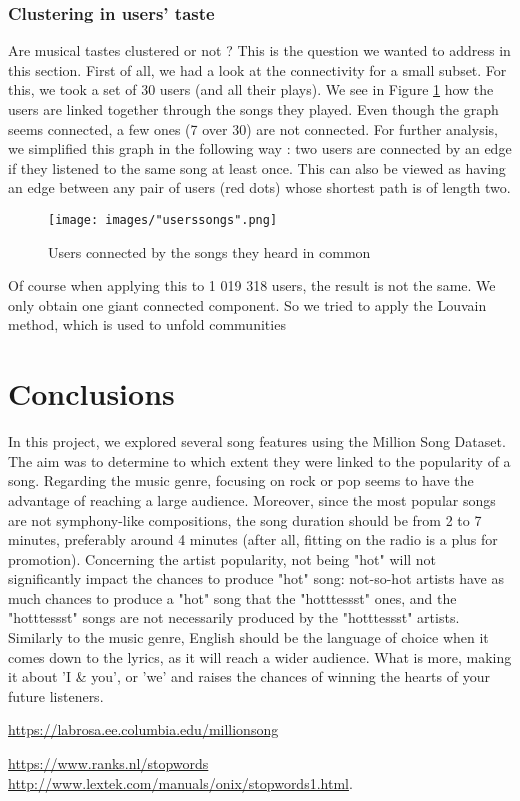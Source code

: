 \documentclass[10pt]{article}
\renewcommand\_{\textunderscore\allowbreak}
\begin{document}
\subsubsection{Clustering in users' taste}
Are musical tastes clustered or not ? This is the question we wanted to address in this section. First of all, we had a look at the connectivity for a small subset. For this, we took a set of 30 users (and all their plays). We see in Figure \ref{fig:user_connected_by_song} how the users are linked together through the songs they played. Even though the graph seems connected, a few ones (7 over 30) are not connected. For further analysis, we simplified this graph in the following way : two users are connected by an edge if they listened to the same song at least once. This can also be viewed as having an edge between any pair of users (red dots) whose shortest path is of length two. 

\begin{figure}[h!]
\centering
\captionsetup{width=0.8\textwidth}
\texttt{[image: images/"users\_songs\_1".png]}
\caption{Users connected by the songs they heard in common}
\label{fig:user_connected_by_song}
\end{figure}

Of course when applying this to 1 019 318 users, the result is not the same. We only obtain one giant connected component. So we tried to apply the Louvain method, which is used to unfold communities 

\section{Conclusions}
In this project, we explored several song features using the Million Song Dataset. The aim was to determine to which extent they were linked to the popularity of a song.
Regarding the music genre, focusing on rock or pop seems to have the advantage of reaching a large audience.
Moreover, since the most popular songs are not symphony-like compositions, the song duration should be from 2 to 7 minutes, preferably around 4 minutes (after all, fitting on the radio is a plus for promotion).
Concerning the artist popularity, not being "hot" will not significantly impact the chances to produce "hot" song: not-so-hot artists have as much chances to produce a "hot" song that the "hotttessst" ones, and the "hotttessst" songs are not necessarily produced by the "hotttessst" artists.
Similarly to the music genre, English should be the language of choice when it comes down to the lyrics, as it will reach a wider audience. What is more, making it about 'I \& you', or 'we' and raises the chances of winning the hearts of your future listeners.

\begin{thebibliography}{}
\url{https://labrosa.ee.columbia.edu/millionsong}

\url{https://www.ranks.nl/stopwords}\\
\url{http://www.lextek.com/manuals/onix/stopwords1.html}.


\end{thebibliography}
\end{document}
